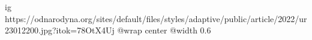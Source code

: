  
 
 
 
 

\ifcmt
  ig https://odnarodyna.org/sites/default/files/styles/adaptive/public/article/2022/ur23012200.jpg?itok=78OtX4Uj
	@wrap center
	@width 0.6
\fi
